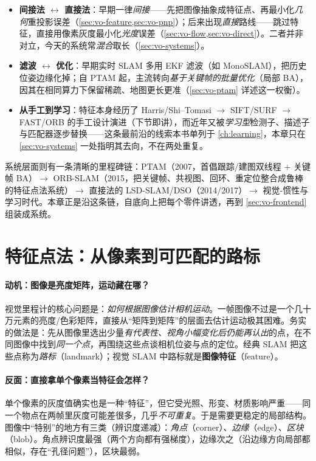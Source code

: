 \begin{itemize}
  \item \textbf{间接法 $\leftrightarrow$ 直接法}：早期一律\emph{间接}——先把图像抽象成特征点、再最小化\emph{几何}重投影误差（\cref{sec:vo-feature,sec:vo-pnp}）；后来出现\emph{直接}路线——跳过特征，直接用像素灰度最小化\emph{光度}误差（\cref{sec:vo-flow,sec:vo-direct}）。二者并非对立，今天的系统常\emph{混合}取长（\cref{sec:vo-systems}）。
  \item \textbf{滤波 $\leftrightarrow$ 优化}：早期实时 SLAM 多用 EKF 滤波（如 MonoSLAM），把历史位姿边缘化掉；自 PTAM 起，主流转向\emph{基于关键帧的批量优化}（局部 BA），因其在相同算力下保留稀疏、地图更长更准（\cref{sec:vo-ptam} 详述这一权衡）。
  \item \textbf{从手工到学习}：特征本身经历了 Harris/Shi--Tomasi $\to$ SIFT/SURF $\to$ FAST/ORB 的手工设计演进（下节即讲），而近年又被\emph{学习型}检测子、描述子与匹配器逐步替换——这条最前沿的线索本书单列于 \cref{ch:learning}，本章只在 \cref{sec:vo-systems} 一处指明其去向，不在两处重复。
\end{itemize}

\noindent 系统层面则有一条清晰的里程碑链：PTAM（2007，首倡跟踪/建图双线程 + 关键帧 BA）$\to$ ORB-SLAM（2015，把关键帧、共视图、回环、重定位整合成鲁棒的特征点法系统）$\to$ 直接法的 LSD-SLAM/DSO（2014/2017）$\to$ 视觉-惯性与学习时代。本章正是沿这条链，自底向上把每个零件讲透，再到 \cref{sec:vo-frontend} 组装成系统。

\section{特征点法：从像素到可匹配的路标}
\label{sec:vo-feature}

\paragraph{动机：图像是亮度矩阵，运动藏在哪？}
视觉里程计的核心问题是：\emph{如何根据图像估计相机运动}\cite{gaoxiang2019slam14}。一帧图像不过是一个几十万元素的亮度/色彩矩阵，直接从“矩阵到矩阵”的层面去估计运动极其困难。务实的做法是：先从图像里选出少量\emph{有代表性、视角小幅变化后仍能再认出}的点，在不同图像中找到\emph{同一个点}，再围绕这些点谈相机位姿与点的定位。经典 SLAM 把这些点称为\emph{路标}（landmark）；视觉 SLAM 中路标就是\textbf{图像特征}（feature）。

\paragraph{反面：直接拿单个像素当特征会怎样？}
单个像素的灰度值确实也是一种“特征”，但它受光照、形变、材质影响严重——同一个物点在两帧里灰度可能差很多，几乎\emph{不可重复}。于是需要更稳定的局部结构。图像中“特别”的地方有三类（辨识度递减）：\emph{角点}（corner）、\emph{边缘}（edge）、\emph{区块}（blob）。角点辨识度最强（两个方向都有强梯度），边缘次之（沿边缘方向局部都相似，存在“孔径问题”），区块最弱。

